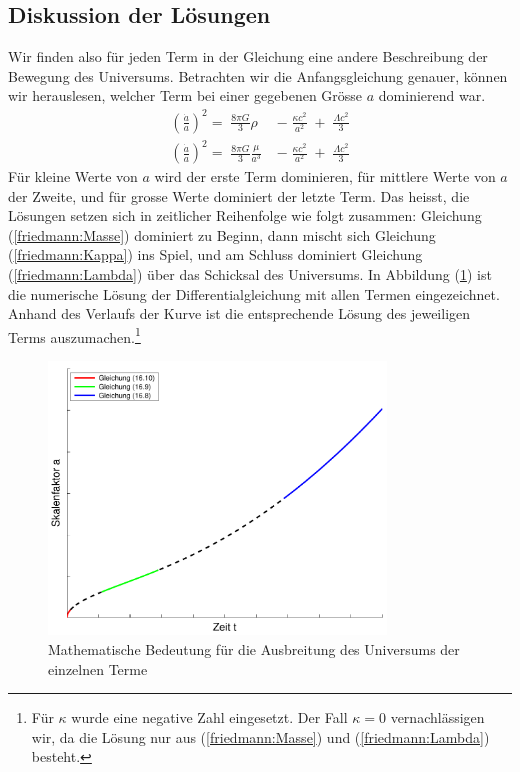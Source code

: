 \begin{refsection}
\subsection*{Diskussion der Lösungen}
Wir finden also für jeden Term in der Gleichung eine andere Beschreibung der Bewegung des Universums. Betrachten wir die Anfangsgleichung genauer, können wir herauslesen, welcher Term bei einer gegebenen Grösse $a$ dominierend war.
\begin{align*}
\left(\frac{\dot{a}}{a}\right) ^2 =\;\frac{8 \pi G}{3} \rho\; &- \;\frac{\kappa c^2}{a^2}\; + \;\frac{\Lambda c^2}{3} \\
\left(\frac{\dot{a}}{a}\right) ^2 = \;\frac{8 \pi G}{3} \frac{\mu}{a^3}\; &-\;\frac{\kappa c^2}{a^2}\; +\; \frac{\Lambda c^2}{3}
\end{align*}
Für kleine Werte von $a$ wird der erste Term dominieren, für mittlere Werte von $a$ der Zweite, und für grosse Werte dominiert der letzte Term. Das heisst, die Lösungen setzen sich in zeitlicher Reihenfolge wie folgt zusammen:
Gleichung (\ref{friedmann:Masse})  dominiert zu Beginn, dann mischt sich Gleichung (\ref{friedmann:Kappa}) ins Spiel, und am Schluss dominiert Gleichung (\ref{friedmann:Lambda}) über das Schicksal des Universums. In Abbildung (\ref{friedmann:mathematischFriedmann}) ist die numerische Lösung der Differentialgleichung mit allen Termen eingezeichnet. Anhand des Verlaufs der Kurve ist die entsprechende Lösung des jeweiligen Terms auszumachen.\footnote{Für $\kappa$ wurde eine negative Zahl eingesetzt. Der Fall $\kappa = 0$ vernachlässigen wir, da die Lösung nur aus (\ref{friedmann:Masse}) und (\ref{friedmann:Lambda}) besteht.}
\begin{figure}[h]
	\centering
	\includegraphics[width = 0.8\textwidth]{friedmann/images/mathematischFriedmann.pdf}
	\caption{Mathematische Bedeutung für die Ausbreitung des Universums der einzelnen Terme}
	\label{friedmann:mathematischFriedmann}
\end{figure}%

\end{refsection}
